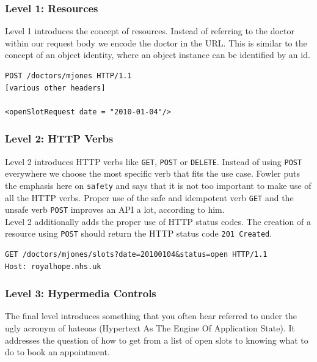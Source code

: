 \subsubsection{Level 1: Resources}
Level 1 introduces the concept of resources. Instead of referring to the doctor within our request body we encode the doctor in the URL. This is similar to the concept of an object identity, where an object instance can be identified by an id.

\lstset{language=XML}
\begin{lstlisting}[caption=Level 1: Referring to the doctor as a resource.]
POST /doctors/mjones HTTP/1.1
[various other headers]

<openSlotRequest date = "2010-01-04"/>
\end{lstlisting}

\subsubsection{Level 2: HTTP Verbs}
Level 2 introduces HTTP verbs like \lstinline{GET}, \lstinline{POST} or \lstinline{DELETE}. Instead of using \lstinline{POST} everywhere we choose the most specific verb that fits the use case.
Fowler puts the emphasis here on \lstinline{safety} and says that it is not too important to make use of all the HTTP verbs. Proper use of the safe and idempotent verb \lstinline{GET} and the unsafe verb \lstinline{POST} improves an API a lot, according to him. \\
Level 2 additionally adds the proper use of HTTP status codes. The creation of a resource using \lstinline{POST} should return the HTTP status code \lstinline{201 Created}.

\lstset{language=}
\begin{lstlisting}[caption=Level 2: Safely fetching the list of open slots using \lstinline{GET}.]
GET /doctors/mjones/slots?date=20100104&status=open HTTP/1.1
Host: royalhope.nhs.uk
\end{lstlisting}

\subsubsection{Level 3: Hypermedia Controls}
The final level introduces something that you often hear referred to under the ugly acronym of \gls{hateoas} (Hypertext As The Engine Of Application State). It addresses the question of how to get from a list of open slots to knowing what to do to book an appointment. \citep{richardsonmaturitymodel}

